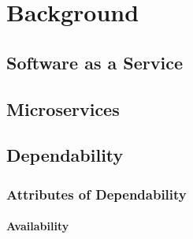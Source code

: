 \chapter{Background}




\section{Software as a Service}




\section{Microservices}




\section{Dependability}




\subsection{Attributes of Dependability}



\subsubsection{Availability}

